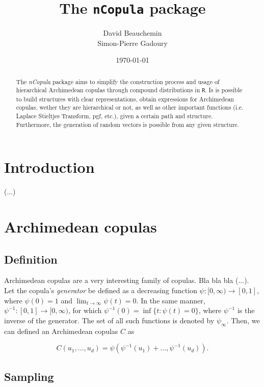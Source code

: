 \documentclass[11pt, english]{article}\usepackage[]{graphicx}\usepackage[]{color}
\title{The \texttt{nCopula} package}
\author{David Beauchemin \\ Simon-Pierre Gadoury}
\date{\today}
\begin{document}
\maketitle

\begin{abstract}
The \emph{nCopula} package aims to simplify the construction process and usage of hierarchical Archimedean copulas through compound distributions in \texttt{R}. Is is possible to build structures with clear representations, obtain expressions for Archimedean copulas, wether they are hierarchical or not, as well as other important functions (i.e. Laplace Stieltjes Transform, pgf, etc.), given a certain path and structure. Furthermore, the generation of random vectors is possible from any given structure.
\end{abstract}

\tableofcontents

\section{Introduction}

(...)

\section{Archimedean copulas}

\subsection{Definition}

Archimedean copulas are a very interesting family of copulas. Bla bla bla (...). \\

Let the copula's \emph{generator} be defined as a decreasing function $\psi : [0, \infty) \to [0, 1]$, where $\psi(0) = 1$ and $\lim_{t \to \infty} \psi(t) = 0$. In the same manner, $\psi^{-1} : [0, 1] \to [0, \infty)$, for which $\psi^{-1}(0) = \inf\{t : \psi(t) = 0\}$, where $\psi^{-1}$ is the inverse of the generator. The set of all such functions is denoted by $\psi_\infty$. Then, we can defined an Archimedean copulas $C$ as

\begin{equation}
  C(u_1, \ldots, u_d) = \psi \left( \psi^{-1}(u_1) + \ldots, \psi^{-1}(u_d) \right).
\end{equation}



\subsection{Sampling}
\end{document}

